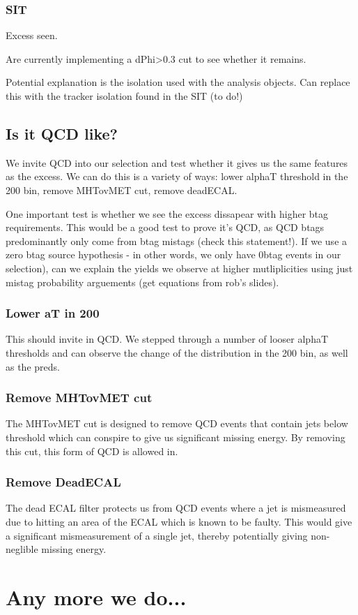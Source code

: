 \subsubsection{SIT}
Excess seen.

Are currently implementing a dPhi>0.3 cut to see whether it remains.

Potential explanation is the isolation used with the analysis objects. Can 
replace this with the tracker isolation found in the SIT (to do!) 

\subsection{Is it QCD like?}
We invite QCD into our selection and test whether it gives us the same features
as the excess. We can do this is a variety of ways: lower alphaT threshold in
the 200 bin, remove MHTovMET cut, remove deadECAL.

One important test is whether we see the excess dissapear with higher btag
requirements. This would be a good test to prove it's QCD, as QCD btags
predominantly only come from btag mistags (check this statement!). If we use
a zero btag source hypothesis - in other words, we only have 0btag events in our
selection), can we explain the yields we observe at higher mutliplicities using
just mistag probability arguements (get equations from rob's slides).

\subsubsection{Lower aT in 200}
This should invite in QCD. We stepped through a number of looser alphaT thresholds
and can observe the change of the distribution in the 200 bin, as well as the preds.

\subsubsection{Remove MHTovMET cut}
The MHTovMET cut is designed to remove QCD events that contain jets below threshold
which can conspire to give us significant missing energy. By removing this cut, this
form of QCD is allowed in.

\subsubsection{Remove DeadECAL}
The dead ECAL filter protects us from QCD events where a jet is mismeasured due
to hitting an area of the ECAL which is known to be faulty. This would give a
significant mismeasurement of a single jet, thereby potentially giving non-neglible
missing energy.

\section{Any more we do...}

